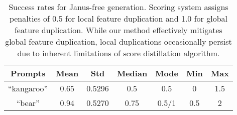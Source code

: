 \begin{table}[t!]
    \centering
    \caption{Success rates for Janus-free generation. Scoring system assigns penalties of 0.5 for local feature duplication and 1.0 for global feature duplication. While our method effectively mitigates global feature duplication, local duplications occasionally persist due to inherent limitations of score distillation algorithm.}
    \begin{tabular}{ccccccc}
    \hline
    \textbf{Prompts} & \textbf{Mean} & \textbf{Std} & \textbf{Median} & \textbf{Mode} & \textbf{Min} & \textbf{Max} \\ \hline
    ``kangaroo''  & 0.65  & 0.5296  & 0.5  & 0.5  & 0  & 1.5  \\ 
    ``bear''  & 0.94  & 0.5270 & 0.75 & 0.5/1 & 0.5 & 2 \\ \hline
    \end{tabular}
    
    \label{tab:app_success_rate}
    \end{table}